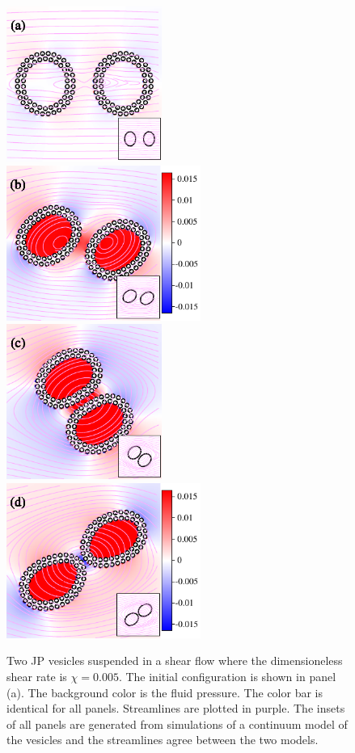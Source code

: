 \documentclass[lineno]{jfm}
\begin{document}
\begin{figure}
\centering
\includegraphics[height=2in]{N116_shear_0.pdf}
\includegraphics[height=2in]{N116_shear_2500.pdf}\\
\includegraphics[height=2in]{N116_shear_5000.pdf}
\includegraphics[height=2in]{N116_shear_7500.pdf}
  \caption{\label{figure10} Two JP vesicles suspended in a shear flow
  where the dimensioneless shear rate is $\chi=0.005$. The initial
  configuration is shown in panel (a). The background color is the fluid
  pressure. The color bar is identical for all panels. Streamlines are
  plotted in purple. The insets of all panels are generated from
  simulations of a continuum model of the vesicles and the streamlines
  agree between the two models.}
\end{figure}
\end{document}
